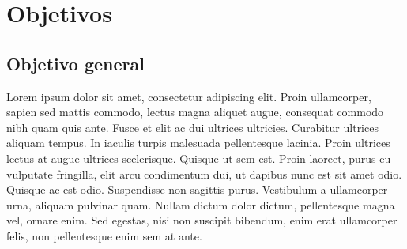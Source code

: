 \documentclass[letterpaper,oneside,openany,11pt]{book}
\begin{document}

\chapter{Objetivos}\label{cap.objetivos}

\section{Objetivo general}
\noindent Lorem ipsum dolor sit amet, consectetur adipiscing elit. Proin ullamcorper, sapien sed mattis commodo, lectus magna aliquet augue, consequat commodo nibh quam quis ante. Fusce et elit ac dui ultrices ultricies. Curabitur ultrices aliquam tempus. In iaculis turpis malesuada pellentesque lacinia. Proin ultrices lectus at augue ultrices scelerisque. Quisque ut sem est. Proin laoreet, purus eu vulputate fringilla, elit arcu condimentum dui, ut dapibus nunc est sit amet odio. Quisque ac est odio. Suspendisse non sagittis purus. Vestibulum a ullamcorper urna, aliquam pulvinar quam. Nullam dictum dolor dictum, pellentesque magna vel, ornare enim. Sed egestas, nisi non suscipit bibendum, enim erat ullamcorper felis, non pellentesque enim sem at ante. \\
\end{document}
